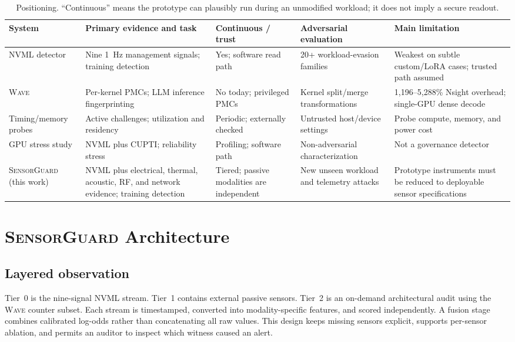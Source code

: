 \documentclass[sigplan,anonymous,review,nonacm]{acmart}
\newcommand{\wave}{\textsc{Wave}}
\newcommand{\system}{\textsc{SensorGuard}}
\begin{document}
\begin{table}[t]
\centering
\caption{Positioning. ``Continuous'' means the prototype can plausibly run during an unmodified workload; it does not imply a secure readout.}
\label{tab:positioning}
\small
\begin{tabularx}{\textwidth}{p{2.45cm}Xp{2.25cm}p{3.15cm}p{4.35cm}}
\toprule
System & Primary evidence and task & Continuous / trust & Adversarial evaluation & Main limitation \\
\midrule
NVML detector~\cite{rahman2026hidden} & Nine 1~Hz management signals; training detection & Yes; software read path & 20+ workload-evasion families & Weakest on subtle custom/LoRA cases; trusted path assumed \\
\wave{}~\cite{xu2026wave} & Per-kernel PMCs; LLM inference fingerprinting & No today; privileged PMCs & Kernel split/merge transformations & 1,196--5,288\% Nsight overhead; single-GPU dense decode \\
Timing/memory probes~\cite{monfared2026timing} & Active challenges; utilization and residency & Periodic; externally checked & Untrusted host/device settings & Probe compute, memory, and power cost \\
GPU stress study~\cite{esposito2025pressure} & NVML plus CUPTI; reliability stress & Profiling; software path & Non-adversarial characterization & Not a governance detector \\
\system{} (this work) & NVML plus electrical, thermal, acoustic, RF, and network evidence; training detection & Tiered; passive modalities are independent & New unseen workload and telemetry attacks & Prototype instruments must be reduced to deployable sensor specifications \\
\bottomrule
\end{tabularx}
\end{table}

\section{\system{} Architecture}
\label{sec:design}

\subsection{Layered observation}

Tier~0 is the nine-signal NVML stream. Tier~1 contains external passive sensors. Tier~2 is an on-demand architectural audit using the \wave{} counter subset. Each stream is timestamped, converted into modality-specific features, and scored independently. A fusion stage combines calibrated log-odds rather than concatenating all raw values. This design keeps missing sensors explicit, supports per-sensor ablation, and permits an auditor to inspect which witness caused an alert.
\end{document}
